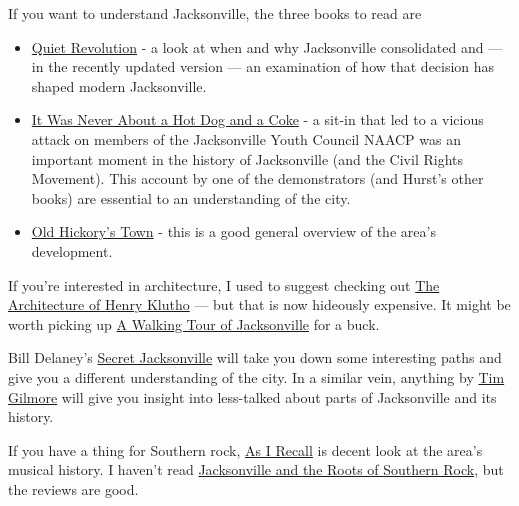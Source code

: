 \documentclass[
  11pt,
  american,
  letterpaperpaper,
  extrafontsizes,onecolumn,openright
  ]{memoir}
\providecommand{\tightlist}{%
  \setlength{\itemsep}{0pt}\setlength{\parskip}{0pt}}
\newlength{\rf}
\begin{document}
If you want to understand Jacksonville, the three books to read are

\begin{itemize}
\tightlist
\item
  \href{https://www.amazon.com/Quiet-Revolution-Consolidation-Jacksonville-Duval-Political/dp/0578565927/ref=sr_1_1}{Quiet Revolution} - a look at when and why Jacksonville consolidated and --- in the recently updated version --- an examination of how that decision has shaped modern Jacksonville.
\item
  \href{https://www.amazon.com/Personal-Account-Demonstrations-Jacksonville-Saturday/dp/1595941959/ref=sr_1_1}{It Was Never About a Hot Dog and a Coke} - a sit-in that led to a vicious attack on members of the Jacksonville Youth Council NAACP was an important moment in the history of Jacksonville (and the Civil Rights Movement). This account by one of the demonstrators (and Hurst's other books) are essential to an understanding of the city.
\item
  \href{https://www.amazon.com/Old-Hickorys-Town-Illustrated-Jacksonville/dp/B000OL8E9O/ref=sr_1_1}{Old Hickory's Town} - this is a good general overview of the area's development.
\end{itemize}

If you're interested in architecture, I used to suggest checking out \href{https://www.amazon.com/Architecture-Henry-John-Klutho-Jacksonville/dp/0813007313/ref=sr_1_1}{The Architecture of Henry Klutho} --- but that is now hideously expensive. It might be worth picking up \href{https://www.amazon.com/Walking-Tour-Jacksonville-Florida-America-ebook/dp/B005C470GG/ref=sr_1_4}{A Walking Tour of Jacksonville} for a buck.

Bill Delaney's \href{https://www.amazon.com/Secret-Jacksonville-Guide-Wonderful-Obscure/dp/1681063344/ref=sr_1_1}{Secret Jacksonville} will take you down some interesting paths and give you a different understanding of the city. In a similar vein, anything by \href{https://www.amazon.com/stores/Tim-Gilmore/author/B00908FHS8}{Tim Gilmore} will give you insight into less-talked about parts of Jacksonville and its history.

If you have a thing for Southern rock, \href{https://www.amazon.com/As-Recall-Jacksonvilles-American-History/dp/1530443024/ref=sr_1_1}{As I Recall} is decent look at the area's musical history. I haven't read \href{https://www.amazon.com/Jacksonville-Roots-Southern-Michael-FitzGerald/dp/0813080355/ref=sr_1_2}{Jacksonville and the Roots of Southern Rock}, but the reviews are good.
\end{document}
